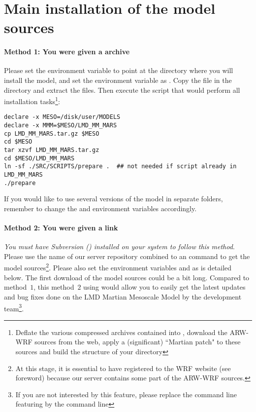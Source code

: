 \mk
\section{Main installation of the model sources}

\paragraph{Method 1: You were given a  archive} Please set the environment variable  to point at the directory where you will install the model, and set the environment variable  as . Copy the  file in the  directory and extract the files. Then execute the  script that would perform all installation tasks\footnote{Deflate the various compressed archives contained into , download the ARW-WRF sources from the web, apply a (significant) ``Martian patch" to these sources and build the structure of your  directory}:
%
\begin{verbatim}       
declare -x MESO=/disk/user/MODELS
declare -x MMM=$MESO/LMD_MM_MARS
cp LMD_MM_MARS.tar.gz $MESO
cd $MESO
tar xzvf LMD_MM_MARS.tar.gz
cd $MESO/LMD_MM_MARS
ln -sf ./SRC/SCRIPTS/prepare .  ## not needed if script already in LMD_MM_MARS
./prepare  
\end{verbatim}

\begin{finger}
\item If you would like to use several versions of the model in separate folders, remember to change the  and  environment variables accordingly.
\end{finger}

\paragraph{Method 2: You were given a  link } \emph{You must have Subversion () installed on your system to follow this method}. Please use the name of our server repository combined to an  command to get the model sources\footnote{At this stage, it is essential to have registered to the WRF website (see foreword) because our server contains some part of the ARW-WRF sources.}. Please also set the environment variables  and  as is detailed below. The first download of the model sources could be a bit long. Compared to method~$1$, this method~$2$ using  would allow you to easily get the latest updates and bug fixes done on the LMD Martian Mesoscale Model by the development team\footnote{If you are not interested by this feature, please replace the command line featuring  by the command line  }.

